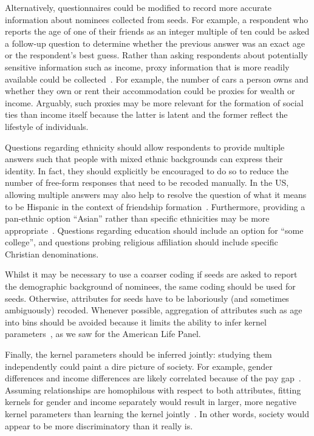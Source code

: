 \documentclass{scrartcl}
\begin{document}
Alternatively, questionnaires could be modified to record more accurate information about nominees collected from seeds. For example, a respondent who reports the age of one of their friends as an integer multiple of ten could be asked a follow-up question to determine whether the previous answer was an exact age or the respondent's best guess. Rather than asking respondents about potentially sensitive information such as income, proxy information that is more readily available could be collected~\cite{Po2012}. For example, the number of cars a person owns and whether they own or rent their accommodation could be proxies for wealth or income. Arguably, such proxies may be more relevant for the formation of social ties than income itself because the latter is latent and the former reflect the lifestyle of individuals.

Questions regarding ethnicity should allow respondents to provide multiple answers such that people with mixed ethnic backgrounds can express their identity. In fact, they should explicitly be encouraged to do so to reduce the number of free-form responses that need to be recoded manually. In the US, allowing multiple answers may also help to resolve the question of what it means to be Hispanic in the context of friendship formation~\cite{Smith2017a}. Furthermore, providing a pan-ethnic option ``Asian'' rather than specific ethnicities may be more appropriate~\cite{Oyserman1997}. Questions regarding education should include an option for ``some college'', and questions probing religious affiliation should include specific Christian denominations.

Whilst it may be necessary to use a coarser coding if seeds are asked to report the demographic background of nominees, the same coding should be used for seeds. Otherwise, attributes for seeds have to be laboriously (and sometimes ambiguously) recoded. Whenever possible, aggregation of attributes such as age into bins should be avoided because it limits the ability to infer kernel parameters~\cite{Hutcheon2010}, as we saw for the American Life Panel.

Finally, the kernel parameters should be inferred jointly: studying them independently could paint a dire picture of society. For example, gender differences and income differences are likely correlated because of the pay gap~\cite{Arulampalam2007}. Assuming relationships are homophilous with respect to both attributes, fitting kernels for gender and income separately would result in larger, more negative kernel parameters than learning the kernel jointly~\cite{Smith2014}. In other words, society would appear to be more discriminatory than it really is.
\end{document}
